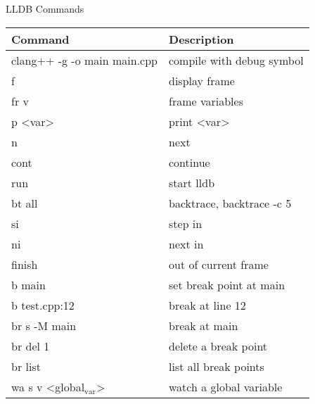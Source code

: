 \documentclass[11pt]{article}
\author{Pramod Nepal}
\date{\today}
\title{}
\begin{document}
\tableofcontents

LLDB Commands

\begin{center}
\begin{tabular}{ll}
Command & Description\\
\hline
clang++ -g -o main main.cpp & compile with debug symbol\\
f & display frame\\
fr v & frame variables\\
p <var> & print <var>\\
n & next\\
cont & continue\\
run & start lldb\\
bt all & backtrace, backtrace -c 5\\
si & step in\\
ni & next in\\
finish & out of current frame\\
b main & set break point at main\\
b test.cpp:12 & break at line 12\\
br s -M main & break at main\\
br del 1 & delete a break point\\
br list & list all break points\\
wa s v <global\(_{\text{var}}\)> & watch a global variable\\
\hline
\end{tabular}
\end{center}
\end{document}
